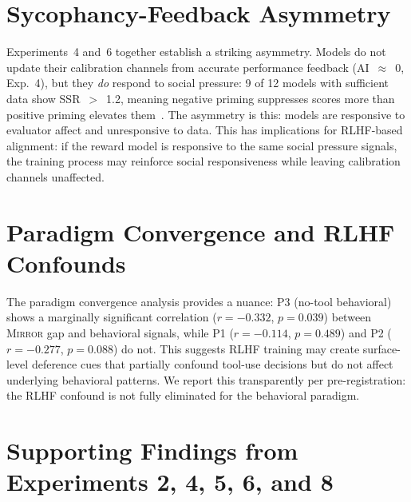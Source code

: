 \documentclass[10pt]{article}
\newcommand{\mirror}{\textsc{Mirror}}
\newcommand{\SSR}{SSR}
\newcommand{\AI}{AI}
\begin{document}
\section{Sycophancy-Feedback Asymmetry}
\label{app:sycophancy}

Experiments~4 and~6 together establish a striking asymmetry. Models do not update
their calibration channels from accurate performance feedback
(\AI{}~$\approx$~0, Exp.~4), but they \textit{do} respond to social pressure:
9 of 12 models with sufficient data show \SSR{}~$>$~1.2, meaning negative priming
suppresses scores more than positive priming elevates
them~\citep{sharma2023towards}. The asymmetry is this: models are responsive to
evaluator affect and unresponsive to data. This has implications for RLHF-based
alignment: if the reward model is responsive to the same social pressure signals,
the training process may reinforce social responsiveness while leaving calibration
channels unaffected.

\section{Paradigm Convergence and RLHF Confounds}
\label{app:rlhf}

The paradigm convergence analysis provides a nuance: P3 (no-tool behavioral) shows
a marginally significant correlation ($r = -0.332$, $p = 0.039$) between \mirror{}
gap and behavioral signals, while P1 ($r = -0.114$, $p = 0.489$) and P2
($r = -0.277$, $p = 0.088$) do not. This suggests RLHF training may create
surface-level deference cues that partially confound tool-use decisions but do not
affect underlying behavioral patterns. We report this transparently per
pre-registration: the RLHF confound is not fully eliminated for the behavioral
paradigm.

\section{Supporting Findings from Experiments 2, 4, 5, 6, and 8}
\label{app:supporting}
\end{document}
